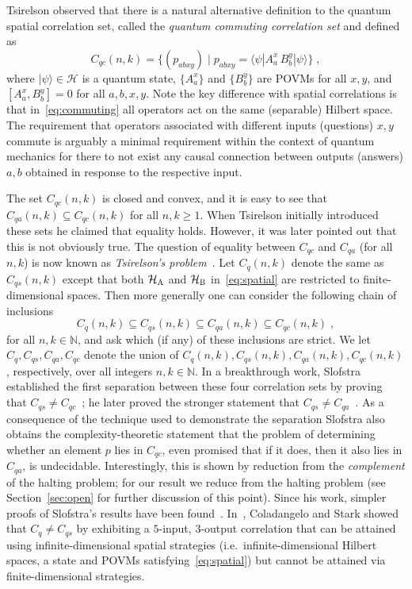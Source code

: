 \documentclass[11pt]{article}
\theoremstyle{definition}
\newcommand{\ket}[1]{|#1\rangle}
\newcommand{\bra}[1]{\langle#1|}
\newcommand{\N}{\ensuremath{\mathbb{N}}}
\newcommand{\mH}{\ensuremath{\mathcal{H}}}
\newcommand{\labelstyle}[1]{\ensuremath{\textsc{#1}}\xspace}
\newcommand{\alice}{\labelstyle{A}}
\newcommand{\bob}{\labelstyle{B}}
\begin{document}
Tsirelson observed that there is a natural alternative definition to the quantum
spatial correlation set, called the \emph{quantum commuting correlation set} and
defined as
\begin{equation}
  \label{eq:commuting}
  C_{qc}(n,k) = \bigl\{ (p_{abxy}) \mid p_{abxy} = \bra{\psi} A^x_a\,  B^y_b
  \ket{\psi} \bigr\}\;,
\end{equation}
where $\ket{\psi}\in \mH$ is a quantum state, $\{A^x_a\}$ and $\{B^y_b\}$ are
POVMs for all $x, y$, and $[A^x_a, B^y_b] = 0$ for all $a, b, x, y$.
Note the key difference with spatial correlations is that
in~\eqref{eq:commuting} all operators act on the same (separable) Hilbert space.
The requirement that operators associated with different inputs (questions)
$x,y$ commute is arguably a minimal requirement within the context of quantum
mechanics for there to not exist any causal connection between outputs (answers)
$a,b$ obtained in response to the respective input.

The set $C_{qc}(n,k)$ is closed and convex, and it is easy to see that $C_{qa}(n,k)\subseteq C_{qc}(n,k)$ for all $n,k\geq 1$. When Tsirelson initially introduced these sets he claimed that equality holds. However, it was later pointed out that this is not obviously true. The question of equality between $C_{qc}$ and $C_{qa}$ (for all $n,k$) is now known as \emph{Tsirelson's problem}~\cite{Tsi06}. Let $	C_q(n,k) $ denote the same as $C_{qs}(n,k)$ except that both $\mH_\alice$ and $\mH_{\bob}$ in~\eqref{eq:spatial} are restricted to finite-dimensional spaces. Then more generally one can consider the following chain of inclusions
\begin{equation}
\label{eq:corr-sets-chain}
	C_q(n,k) \subseteq C_{qs}(n,k) \subseteq C_{qa}(n,k) \subseteq C_{qc}(n,k)\;,
\end{equation}
for all $n,k \in \N$, and ask which (if any) of these inclusions are strict. We let $C_q,C_{qs},C_{qa},C_{qc}$ denote the union of $C_q(n,k),C_{qs}(n,k),C_{qa}(n,k),C_{qc}(n,k)$, respectively, over all integers $n,k \in \N$. 
In a breakthrough work, Slofstra established the first separation between these four correlation sets by proving that $C_{qs} \neq C_{qc}$~\cite{slofstra2019tsirelson}; he later proved the stronger statement that $C_{qs} \neq C_{qa}$~\cite{slofstra2019set}. As a consequence of the technique used to demonstrate the separation Slofstra also obtains the complexity-theoretic statement that the problem of determining whether an element $p$ lies in $C_{qc}$, even promised that if it does, then it also lies in $C_{qa}$, is undecidable. Interestingly, this is shown by reduction from the \emph{complement} of the halting problem; for our result we reduce from the halting problem (see Section~\ref{sec:open} for further discussion of this point). 
Since his work, simpler proofs of Slofstra's results have been found~\cite{dykema2019non,musat2018non,coladangelo2019two}. In~\cite{coladangelo2018unconditional}, Coladangelo and Stark showed that $C_{q} \neq C_{qs}$ by exhibiting a $5$-input, $3$-output correlation that can be attained using infinite-dimensional spatial strategies (i.e.\ infinite-dimensional Hilbert spaces, a state and POVMs satisfying~\eqref{eq:spatial}) but cannot be attained via finite-dimensional strategies.
\end{document}
